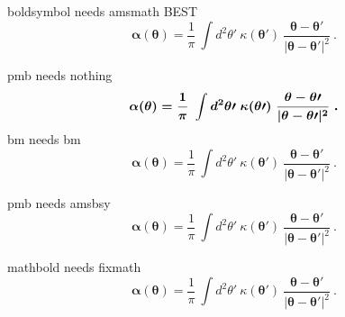 \documentclass{article}
\newcommand{\abs}[1]{\lvert#1\rvert}
\begin{document}
boldsymbol needs amsmath BEST
\begin{equation}\label{[eq:alpah_kappa]}
  \boldsymbol{\alpha}(\boldsymbol{\theta} ) = \frac{1}{\pi}\ \int d^2 \theta\prime \ \kappa(\boldsymbol{\theta}\prime) \ \frac{\boldsymbol{\theta} - \boldsymbol{\theta\prime} }{\abs{\boldsymbol{\theta} - \boldsymbol{\theta\prime} }^2}\  .
\end{equation}

pmb needs nothing
\begin{equation}\label{[eq:alpah_kappa]}
  \boldmath{\alpha}(\boldmath{\theta} ) = \frac{1}{\pi}\ \int d^2 \theta\prime \ \kappa(\boldmath{\theta}\prime) \ \frac{\boldmath{\theta} - \boldmath{\theta\prime} }{\abs{\boldmath{\theta} - \boldmath{\theta\prime} }^2}\  .
\end{equation}
bm needs bm
\begin{equation}\label{[eq:alpah_kappa]}
  \bm{\alpha}(\bm{\theta} ) = \frac{1}{\pi}\ \int d^2 \theta\prime \ \kappa(\bm{\theta}\prime) \ \frac{\bm{\theta} - \bm{\theta\prime} }{\abs{\bm{\theta} - \bm{\theta\prime} }^2}\  .
\end{equation}

pmb needs amsbsy
\begin{equation}\label{[eq:alpah_kappa]}
  \pmb{\alpha}(\pmb{\theta} ) = \frac{1}{\pi}\ \int d^2 \theta\prime \ \kappa(\pmb{\theta}\prime) \ \frac{\pmb{\theta} - \pmb{\theta\prime} }{\abs{\pmb{\theta} - \pmb{\theta\prime} }^2}\  .
\end{equation}

mathbold needs fixmath
\begin{equation}\label{[eq:alpah_kappa]}
  \mathbold{\alpha}(\mathbold{\theta} ) = \frac{1}{\pi}\ \int d^2 \theta\prime \ \kappa(\mathbold{\theta}\prime) \ \frac{\mathbold{\theta} - \mathbold{\theta\prime} }{\abs{\mathbold{\theta} - \mathbold{\theta\prime} }^2}\  .
\end{equation}
\end{document}
